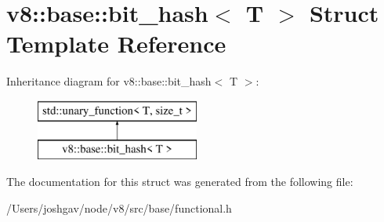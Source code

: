 \hypertarget{structv8_1_1base_1_1bit__hash}{}\section{v8\+:\+:base\+:\+:bit\+\_\+hash$<$ T $>$ Struct Template Reference}
\label{structv8_1_1base_1_1bit__hash}
Inheritance diagram for v8\+:\+:base\+:\+:bit\+\_\+hash$<$ T $>$\+:\begin{figure}[H]
\begin{center}
\leavevmode
\includegraphics[height=2.000000cm]{structv8_1_1base_1_1bit__hash}
\end{center}
\end{figure}


The documentation for this struct was generated from the following file\+:\begin{DoxyCompactItemize}
\item 
/\+Users/joshgav/node/v8/src/base/functional.\+h\end{DoxyCompactItemize}
